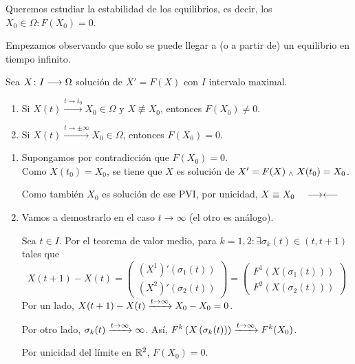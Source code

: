 Queremos estudiar la estabilidad de los equilibrios, es decir, los $X_0\in\Omega : F(X_0) = 0$.

Empezamos observando que solo se puede llegar a (o a partir de) un equilibrio en tiempo infinito.

\begin{prop}
	Sea $X \colon I \longrightarrow \Omega$ solución de $X'=F(X)$ con $I$ intervalo maximal.
	\begin{enumerate}
		\item Si $X(t) \xrightarrow{t\to t_0} X_0 \in \Omega$ y $X\not\equiv X_0$, entonces $F(X_0)\ne 0$.
		\item Si $X(t) \xrightarrow{t\to\pm\infty} X_0 \in \Omega$, entonces $F(X_0) = 0$.
	\end{enumerate}
	\begin{dem}
		\begin{enumerate}
			\item Supongamos por contradicción que $F(X_0) = 0$. \\
			      Como $X(t_0) = X_0$, se tiene que $X$ es solución de $X'=F(X) \; _{\wedge} \; X(t_0) = X_0$.

			      Como también $X_0$ es solución de ese PVI, por unicidad, $X\equiv X_0 \quad  \longrightarrow\longleftarrow$

			\item Vamos a demostrarlo en el caso $t\to \infty$ (el otro es análogo).

			      Sea $t\in I$. Por el teorema de valor medio, para $k =1, 2 : \exists \sigma_k (t) \in (t, t+1)$ tales que
			      \[X(t+1) - X(t) = \begin{pmatrix}
					      \left(X^1\right)'(\sigma_1(t)) \\
					      \left(X^2\right)'(\sigma_2(t))
				      \end{pmatrix} = \begin{pmatrix}
					      F^1(X(\sigma_1(t))) \\
					      F^2(X(\sigma_2(t)))
				      \end{pmatrix}\]
			      Por un lado, $\displaystyle X(t+1) - X(t) \xrightarrow{t\to\infty} X_0 - X_0 = 0$.

			      Por otro lado, $\displaystyle \sigma_k(t) \xrightarrow{t\to\infty} \infty$. Así, $\displaystyle F^k\left(X\left(\sigma_k(t)\right)\right) \xrightarrow{t\to\infty} F^k(X_0)$.

			      Por unicidad del límite en $\mathbb{R}^2$, $F(X_0) = 0$.
		\end{enumerate}
	\end{dem}
\end{prop}

